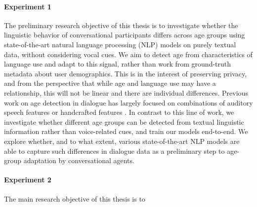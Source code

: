\paragraph{Experiment 1 } The preliminary research objective of this thesis is to investigate whether the linguistic behavior of conversational participants differs across age groups using state-of-the-art natural language processing (NLP) models on purely textual data, without considering vocal cues.
We aim to detect age from characteristics of language use and adapt to this signal, rather than work from ground-truth metadata about user demographics.
This is in the interest of preserving privacy, and from the perspective that while age and language use may have a relationship, this will not be linear \citep{pennebaker2003words} and there are individual differences.
Previous work on age detection in dialogue has largely focused on combinations of auditory speech features or handcrafted features \citep{schler2006effects, wolters2009age, li2013automatic}.
In contrast to this line of work, we investigate whether different age groups can be detected from textual linguistic information rather than voice-related cues, and train our models end-to-end. We explore whether, and to what extent, various state-of-the-art NLP models are able to capture such differences in dialogue data as a preliminary step to age-group adaptation by conversational agents.

\paragraph{Experiment 2} The main research objective of this thesis is to

